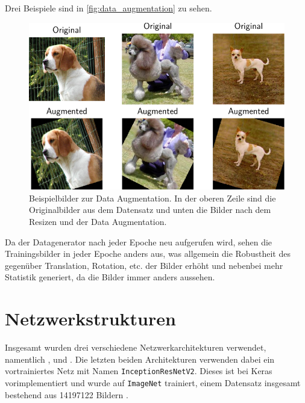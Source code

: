 Drei Beispiele sind in \autoref{fig:data_augmentation} zu sehen.

\begin{figure}
  \centering
  \includegraphics[width=\the\textwidth]{pics/subplot.pdf}
  \caption{Beispielbilder zur Data Augmentation. In der oberen Zeile sind die
  Originalbilder aus dem Datensatz und unten die Bilder nach dem Resizen und der Data Augmentation.}
  \label{fig:data_augmentation}
\end{figure}

Da der Datagenerator nach jeder Epoche neu aufgerufen wird, sehen die
Trainingsbilder in jeder Epoche anders aus, was allgemein die Robustheit des
\CNN gegenüber Translation, Rotation, etc. der Bilder erhöht und nebenbei mehr
Statistik generiert, da die Bilder immer anders aussehen.

\section{Netzwerkstrukturen}
Insgesamt wurden drei verschiedene Netzwerkarchitekturen verwendet, namentlich
\MiniDog, \PreDog und \PreBig. Die letzten beiden Architekturen verwenden dabei
ein vortrainiertes Netz mit Namen \texttt{InceptionResNetV2}. Dieses ist bei
Keras vorimplementiert \cite{inception} und wurde auf \texttt{ImageNet}
trainiert, einem Datensatz insgesamt bestehend aus 14197122 Bildern
\cite{imagenet}.

